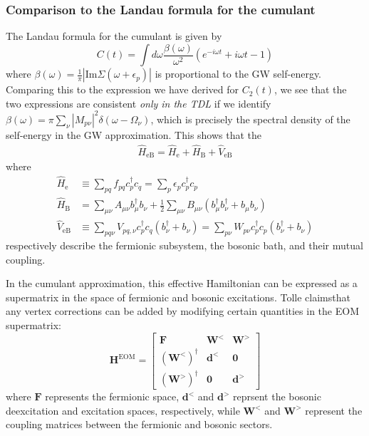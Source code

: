\subsubsection{Comparison to the Landau formula for the cumulant}
The Landau formula for the cumulant is given by
\begin{equation}
C(t) = \int d\omega \frac{\beta(\omega)}{\omega^2} \left( e^{-i\omega t} + i\omega t - 1 \right)
\end{equation}
where $\beta(\omega) = \frac{1}{\pi} |\text{Im} \Sigma(\omega + \epsilon_p)|$ is proportional to the GW self-energy.
Comparing this to the expression we have derived for $C_2(t)$, we see that the two expressions are consistent \emph{only in the TDL} if we identify $\beta(\omega) = \pi \sum_\nu |M_{p\nu}|^2 \delta(\omega - \Omega_\nu)$, which is precisely the spectral density of the self-energy in the GW approximation. This shows that the
\begin{align}
    \hat{H}_{\text{eB}} = \hat{H}_{\text{e}} + \hat{H}_{\text{B}} + \hat{V}_{\text{eB}}
\end{align}
where
\begin{align}
    \hat{H}_{\text{e}}
    & \equiv \sum_{pq} f_{pq} c_p^\dagger c_q = \sum_p \epsilon_p c_p^\dagger c_p
    \\
    \label{eq:HB}
    \hat{H}_{\text{B}}
    & = \sum_{\mu\nu} A_{\mu\nu} b_\mu^\dagger b_\nu 
    + \frac{1}{2} \sum_{\mu\nu} B_{\mu\nu} \left( b_\mu^\dagger b_\nu^\dagger + b_\mu b_\nu \right)
    \\
    \hat{V}_{\text{eB}} 
    & \equiv \sum_{pq\nu} V_{pq,\nu}  c_p^\dagger c_q \left( b_\nu^\dagger + b_\nu \right) = \sum_{p\nu } W_{p\nu} c_p^\dagger c_p \left( b_\nu^\dagger + b_\nu \right)
\end{align} 
respectively describe the fermionic subsystem, the bosonic bath, and their mutual coupling.

 In the cumulant approximation, this effective Hamiltonian can be expressed as a supermatrix in the space of fermionic and bosonic excitations.
Tolle claimsthat any vertex corrections can be added by modifying certain quantities in the  EOM supermatrix:
\begin{equation}
\bm{H}^{\mathrm{EOM}} = \begin{bmatrix}
    \bm{F} & \bm{W}^< & \bm{W}^> \\
    \left(\bm{W}^<\right)^\dagger&  \bm{d}^< & \bm{0} \\
    \left(\bm{W}^>\right)^\dagger & \bm{0} & \bm{d}^>
\end{bmatrix}
\end{equation}
where $\bm{F}$ represents the fermionic space, $\bm{d}^<$ and $\bm{d}^>$ reprsent the bosonic deexcitation and excitation spaces, respectively, while $\bm{W}^<$ and $\bm{W}^>$ represent the coupling matrices between the fermionic and bosonic sectors.
